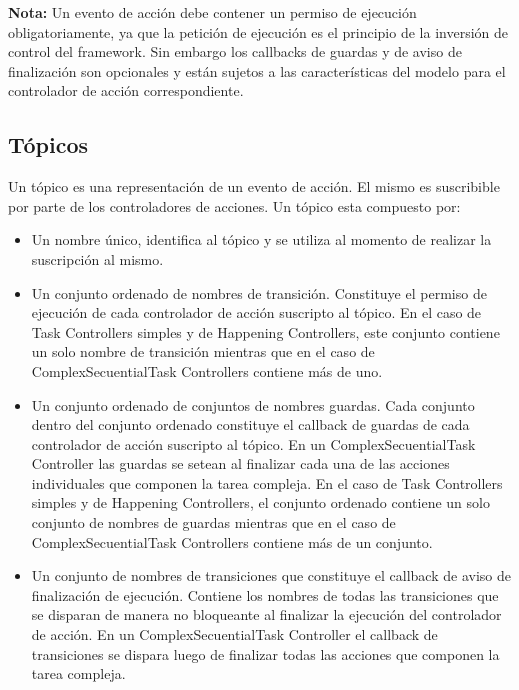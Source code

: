 \begin{framed}
\textbf{Nota:} Un evento de acción debe contener un permiso de ejecución
obligatoriamente, ya que la petición de ejecución es el principio de la
inversión de control del framework. Sin embargo los callbacks de guardas y de
aviso de finalización son opcionales y están sujetos a las características del
modelo para el controlador de acción correspondiente.
\end{framed}

\subsection{Tópicos}
Un tópico es una representación de un evento de acción. El mismo es
suscribible por parte de los controladores de acciones. Un tópico esta compuesto
por:
\begin{itemize}
  \item Un nombre único, identifica al tópico y se utiliza al momento de
  realizar la suscripción al mismo.
  \item Un conjunto ordenado de nombres de transición. Constituye el permiso
  de ejecución de cada controlador de acción suscripto al tópico. En el caso de
  Task Controllers simples y de Happening Controllers, este conjunto contiene
  un solo nombre de transición mientras que en el caso de ComplexSecuentialTask
  Controllers contiene más de uno.
  \item Un conjunto ordenado de conjuntos de nombres guardas. Cada conjunto
   dentro del conjunto ordenado constituye el callback de guardas de cada
   controlador de acción suscripto al tópico. En un  ComplexSecuentialTask
   Controller las guardas se setean al finalizar cada una de las acciones
   individuales que componen la tarea compleja. En el caso de
  Task Controllers simples y de Happening Controllers, el conjunto ordenado
  contiene un solo conjunto de nombres de guardas mientras que en el caso de
  ComplexSecuentialTask Controllers contiene más de un conjunto.
  \item Un conjunto de nombres de transiciones que constituye el callback de
  aviso de finalización de ejecución. Contiene los nombres de todas las
  transiciones que se disparan de manera no bloqueante al finalizar la ejecución
  del controlador de acción. En un  ComplexSecuentialTask
  Controller el callback de transiciones se dispara luego de finalizar todas
  las acciones que componen la tarea compleja.
\end{itemize}
